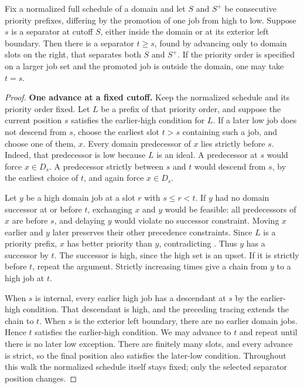 \begin{lemma}\label{lem:shared}
Fix a normalized full schedule of a domain and let \(S\) and \(S^+\)
be consecutive priority prefixes, differing by the promotion of one job
from high to low. Suppose \(s\) is a separator at cutoff \(S\),
either inside the domain or at its exterior left boundary.
Then there is a separator \(t\ge s\), found by advancing only to
domain slots on the right, that separates both \(S\) and \(S^+\).
If the priority order is specified on a larger job set and the promoted
job is outside the domain, one may take \(t=s\).
\end{lemma}
\begin{proof}
\textbf{One advance at a fixed cutoff.}
Keep the normalized schedule and its priority order fixed. Let \(L\)
be a prefix of that priority order, and suppose the current position
\(s\) satisfies the earlier-high condition for \(L\).
If a later low job does not descend from \(s\), choose the earliest
slot \(t>s\) containing such a job, and choose one of them, \(x\).
Every domain predecessor of \(x\) lies strictly before \(s\).
Indeed, that predecessor is low because \(L\) is an ideal.
A predecessor at \(s\) would force \(x\in D_s\). A predecessor
strictly between \(s\) and \(t\) would descend from \(s\), by the
earliest choice of \(t\), and again force \(x\in D_s\).

Let \(y\) be a high domain job at a slot \(r\) with \(s\le r<t\).
If \(y\) had no domain successor at or before \(t\), exchanging
\(x\) and \(y\) would be feasible: all predecessors of \(x\) are
before \(s\), and delaying \(y\) would violate no successor
constraint. Moving \(x\) earlier and \(y\) later preserves their
other precedence constraints. Since \(L\) is a priority prefix,
\(x\) has better priority than \(y\), contradicting
. Thus \(y\) has a successor by \(t\).
The successor is high, since the high set is an upset. If it is
strictly before \(t\), repeat the argument. Strictly increasing
times give a chain from \(y\) to a high job at \(t\).

When \(s\) is internal, every earlier high job has a descendant
at \(s\) by the earlier-high condition. That descendant is high,
and the preceding tracing extends the chain to \(t\).
When \(s\) is the exterior left boundary, there are no earlier
domain jobs. Hence \(t\) satisfies the earlier-high condition.
We may advance to \(t\) and repeat until there is no later low
exception. There are finitely many slots, and every advance is
strict, so the final position also satisfies the later-low condition.
Throughout this walk the normalized schedule itself stays fixed;
only the selected separator position changes.


\end{proof}
